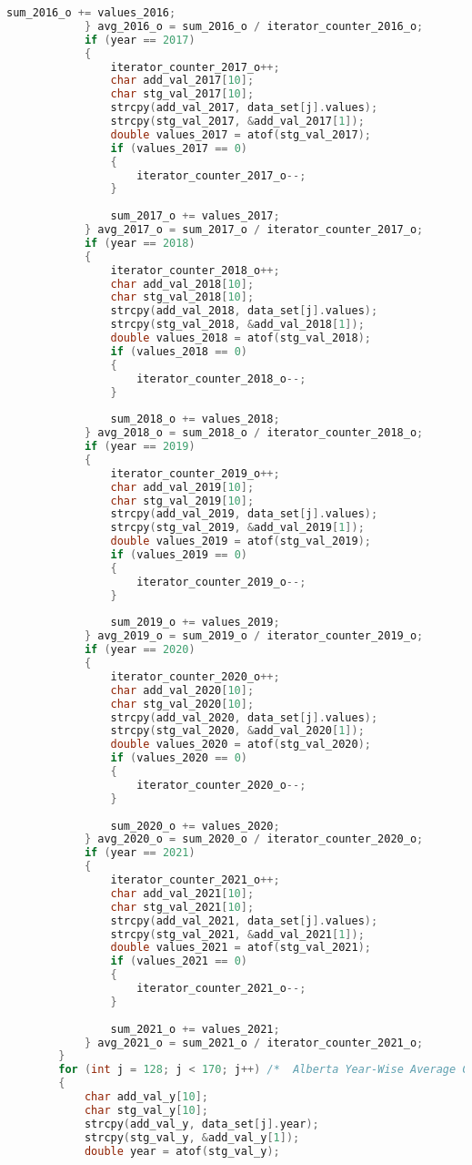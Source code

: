 \begin{lstlisting}[language=C, caption=\textit{CPS 188 Term Project Source Code}]
				sum_2016_o += values_2016;
			} avg_2016_o = sum_2016_o / iterator_counter_2016_o;
			if (year == 2017)
			{
				iterator_counter_2017_o++;
				char add_val_2017[10];
				char stg_val_2017[10];
				strcpy(add_val_2017, data_set[j].values);
				strcpy(stg_val_2017, &add_val_2017[1]);
				double values_2017 = atof(stg_val_2017);
				if (values_2017 == 0)
				{
					iterator_counter_2017_o--;
				}
				
				sum_2017_o += values_2017;
			} avg_2017_o = sum_2017_o / iterator_counter_2017_o;
			if (year == 2018)
			{
				iterator_counter_2018_o++;
				char add_val_2018[10];
				char stg_val_2018[10];
				strcpy(add_val_2018, data_set[j].values);
				strcpy(stg_val_2018, &add_val_2018[1]);
				double values_2018 = atof(stg_val_2018);
				if (values_2018 == 0)
				{
					iterator_counter_2018_o--;
				}
				
				sum_2018_o += values_2018;
			} avg_2018_o = sum_2018_o / iterator_counter_2018_o;
			if (year == 2019)
			{
				iterator_counter_2019_o++;
				char add_val_2019[10];
				char stg_val_2019[10];
				strcpy(add_val_2019, data_set[j].values);
				strcpy(stg_val_2019, &add_val_2019[1]);
				double values_2019 = atof(stg_val_2019);
				if (values_2019 == 0)
				{
					iterator_counter_2019_o--;
				}
				
				sum_2019_o += values_2019;
			} avg_2019_o = sum_2019_o / iterator_counter_2019_o;
			if (year == 2020)
			{
				iterator_counter_2020_o++;
				char add_val_2020[10];
				char stg_val_2020[10];
				strcpy(add_val_2020, data_set[j].values);
				strcpy(stg_val_2020, &add_val_2020[1]);
				double values_2020 = atof(stg_val_2020);
				if (values_2020 == 0)
				{
					iterator_counter_2020_o--;
				}
				
				sum_2020_o += values_2020;
			} avg_2020_o = sum_2020_o / iterator_counter_2020_o;
			if (year == 2021)
			{
				iterator_counter_2021_o++;
				char add_val_2021[10];
				char stg_val_2021[10];
				strcpy(add_val_2021, data_set[j].values);
				strcpy(stg_val_2021, &add_val_2021[1]);
				double values_2021 = atof(stg_val_2021);
				if (values_2021 == 0)
				{
					iterator_counter_2021_o--;
				}
				
				sum_2021_o += values_2021;
			} avg_2021_o = sum_2021_o / iterator_counter_2021_o;
		}
		for (int j = 128; j < 170; j++)	/*	Alberta Year-Wise Average Calculator	*/
		{
			char add_val_y[10];
			char stg_val_y[10];
			strcpy(add_val_y, data_set[j].year);
			strcpy(stg_val_y, &add_val_y[1]);
			double year = atof(stg_val_y);
			

\end{lstlisting}
